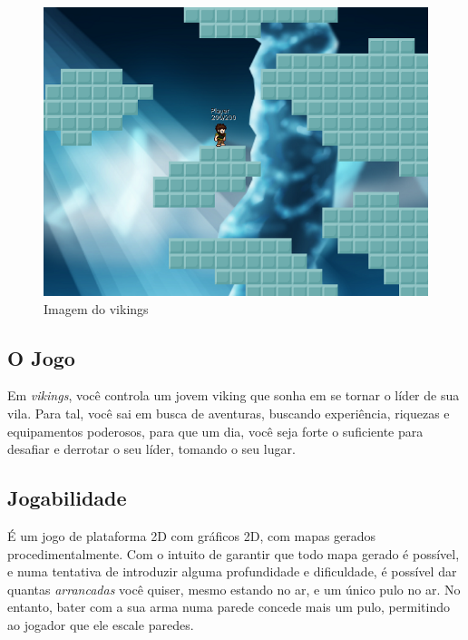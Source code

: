   \begin{figure}
    \label{sec:conceitos:vikings:screenshot}
    \includegraphics{imagens/vikings-1.png}
    \caption{Imagem do vikings}
  \end{figure}
  
  \addtocounter{footnote}{-3}


  \subsection{O Jogo}
    Em \textit{vikings}, você controla um jovem viking que sonha em se tornar o líder de sua vila. Para tal,
    você sai em busca de aventuras, buscando experiência, riquezas e equipamentos poderosos, para que um dia,
    você seja forte o suficiente para desafiar e derrotar o seu líder, tomando o seu lugar.
        
  \subsection{Jogabilidade}
    É um jogo de plataforma 2D com gráficos 2D, com mapas gerados procedimentalmente. Com o intuito de garantir
    que todo mapa gerado é possível, e numa tentativa de introduzir alguma profundidade e dificuldade, é
    possível dar quantas \textit{arrancadas} você quiser, mesmo estando no ar, e um único pulo no ar. No
    entanto, bater com a sua arma numa parede concede mais um pulo, permitindo ao jogador que ele escale
    paredes.
    
